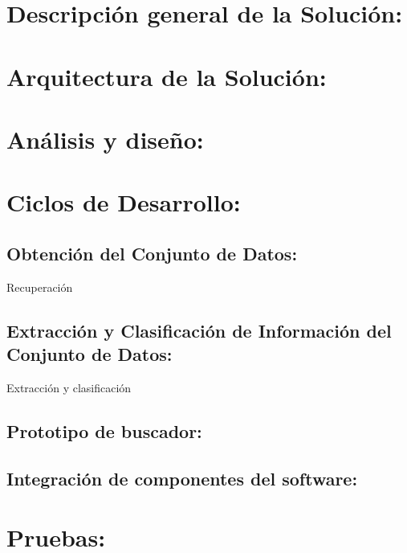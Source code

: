 \documentclass[
  10,
  openany]{book}
\begin{document}
\hypertarget{desarollodescripcion}{%
\section{Descripción general de la Solución:}\label{desarollodescripcion}}

\hypertarget{desarrolloarquitectura}{%
\section{Arquitectura de la Solución:}\label{desarrolloarquitectura}}

\hypertarget{desarrolloanalisis}{%
\section{Análisis y diseño:}\label{desarrolloanalisis}}

\hypertarget{desarrollociclos}{%
\section{Ciclos de Desarrollo:}\label{desarrollociclos}}

\hypertarget{desarrollociclos1}{%
\subsection{Obtención del Conjunto de Datos:}\label{desarrollociclos1}}

Recuperación

\hypertarget{desarrollociclos2}{%
\subsection{Extracción y Clasificación de Información del Conjunto de Datos:}\label{desarrollociclos2}}

Extracción y clasificación

\hypertarget{desarrollociclos3}{%
\subsection{Prototipo de buscador:}\label{desarrollociclos3}}

\hypertarget{desarrollociclos4}{%
\subsection{Integración de componentes del software:}\label{desarrollociclos4}}

\hypertarget{pruebas}{%
\section{Pruebas:}\label{pruebas}}
\end{document}
